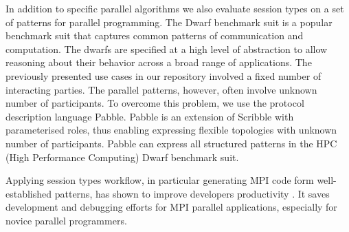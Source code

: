 
 In addition to specific parallel algorithms we also evaluate session types on a set of patterns for parallel programming.  The Dwarf benchmark suit \cite{BerkleyPar} is a popular benchmark suit that captures common patterns of communication and computation. %
The dwarfs are specified at a high level of abstraction to allow reasoning about their behavior across a broad range of applications.
The previously presented use cases in our repository involved a fixed number of interacting parties. The parallel patterns, however, often involve unknown number of participants. To overcome this problem, we use the protocol description language Pabble. 
Pabble is an extension of Scribble with parameterised roles, thus enabling expressing flexible topologies with unknown number of participants.  Pabble can express all structured patterns in the HPC (High Performance Computing) Dwarf benchmark suit. 

Applying session types workflow, in particular generating MPI code form well-established patterns, has shown to improve developers productivity \cite{NCY2015}. It saves development and debugging efforts for MPI parallel applications, especially for novice parallel programmers.

